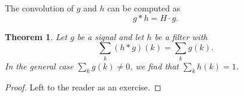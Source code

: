 \documentclass[11pt]{scrartcl}
\newcommand{\FT}{\mathcal{F}}
\newcommand{\IFT}{\mathcal{F}^{-1}}
\newcommand{\conv}{\ast}
\newtheorem*{theorem}{Theorem}
\begin{document}
%
%
The convolution of $g$ and $h$ can be computed as 
%
\begin{equation*}
 g\conv h = H\cdot g.
\end{equation*}
%
\begin{theorem}
Let $g$ be a signal and let $h$ be a filter with 
\[
\sum_k (h\conv g)(k) = \sum_k g(k). 
\]
In the general case $\sum_k g(k) \neq 0$, we find that $\sum_k h(k) = 1$.
\end{theorem}
\begin{proof}
 Left to the reader as an exercise.
\end{proof}
\end{document}

